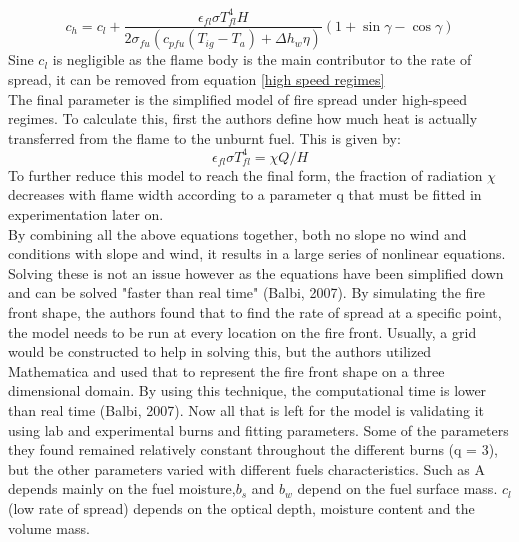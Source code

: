 \documentclass{article}
\begin{document}
\begin{equation}
	\label{high speed regimes}
	c_h = c_l  + \frac {\epsilon _{fl} \sigma T^{4}_{fl} H} {2 \sigma _ {fu} (c_{pfu}(T_{ig} - T_a) + \Delta h _ w \eta)} (1 + \sin \gamma - \cos \gamma)
\end{equation}
\indent Sine $c_l$ is negligible as the flame body is the main contributor to the rate of spread, it can be removed from equation \ref{high speed regimes}\\
\indent The final parameter is the simplified model of fire spread under high-speed regimes. To calculate this, first the authors define how much heat is actually transferred from the flame to the unburnt fuel. This is given by:
\begin{equation}
	\label{high speed regimes 2007}
	\epsilon_{fl} \sigma T^{4}_{fl} = \chi Q / H
\end{equation} 
To further reduce this model to reach the final form, the fraction of radiation $\chi$ decreases with flame width according to a parameter q that must be fitted in experimentation later on. \\
\indent By combining all the above equations together, both no slope no wind and conditions with slope and wind, it results in a large series of nonlinear equations. Solving these is not an issue however as the equations have been simplified down and can be solved "faster than real time" (Balbi, 2007). By simulating the fire front shape, the authors found that to find the rate of spread at a specific point, the model needs to be run at every location on the fire front. Usually, a grid would be constructed to help in solving this, but the authors utilized Mathematica and used that to represent the fire front shape on a three dimensional domain. By using this technique, the computational time is lower than real time (Balbi, 2007). Now all that is left for the model is validating it using lab and experimental burns and fitting parameters. Some of the parameters they found remained relatively constant throughout the different burns (q = 3), but the other parameters varied with different fuels characteristics. Such as A depends mainly on the fuel moisture,$b_s$ and $b_w$ depend on the fuel surface mass. $c_l$ (low rate of spread) depends on the optical depth, moisture content and the volume mass. \\
\end{document}
